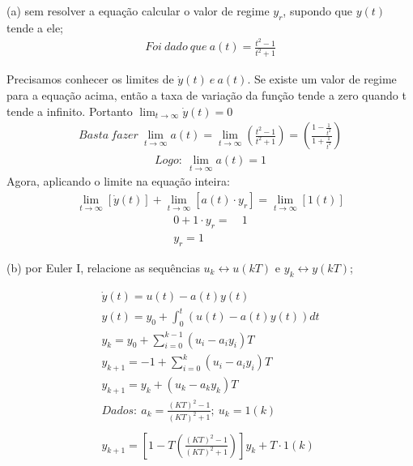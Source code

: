 \documentclass[10pt]{article}
\begin{document}
(a) sem resolver a equação calcular o valor de regime $y_r$, supondo que $y(t)$ tende a ele;
\begin{align*}
    Foi\ dado\ que\ a(t) = \frac{t^2-1}{t^2+1} 
\end{align*}

Precisamos conhecer os limites de $ \dot{y}(t)\ e\ a(t) $.
Se existe um valor de regime para a equação acima, então a taxa de variação da função tende a zero
quando t tende a infinito. Portanto $ \lim_{t\to\infty} \dot{y}(t) = 0 $
\begin{align*}
    Basta\ fazer\ \lim_{t\to\infty} a(t) = \lim_{t\to\infty} \left( \frac{t^2-1}{t^2+1} \right) = \left( \frac{1-\frac{1}{t^2}}{1+\frac{1}{t^2}} \right)
\end{align*}
\begin{align*}
    Logo:\ \lim_{t\to\infty} a(t) = 1
\end{align*}
Agora, aplicando o limite na equação inteira:
\begin{align*}
    \lim_{t\to\infty} [\dot{y}(t)] + \lim_{t\to\infty} [a(t) \cdot y_r] = \lim_{t\to\infty} [1(t)]
\end{align*}
\begin{align*}
    0 + 1 \cdot y_r =&\ 1\\
    y_r = 1
\end{align*}

(b) por Euler I, relacione as sequências $u_k \leftrightarrow u(kT)$ e $y_k \leftrightarrow y(kT)$;

\begin{align*}
    \dot{y}(t) = u(t) - a(t)y(t)\\
    y(t) = y_{0} + \int_{0}^{t} (u(t) - a(t)y(t))dt\\
    y_k = y_0 + \sum_{i=0}^{k-1} (u_i - a_i y_i)T\\
    y_{k+1} = -1 + \sum_{i=0}^{k} (u_i - a_i y_i)T\\
    y_{k+1} = y_k + (u_k - a_k y_k)T\\
    Dados:\ a_k = \frac{(KT)^2-1}{(KT)^2+1};\ u_k = 1(k)\\ \\
    y_{k+1} = \left[ 1 - T \left( \frac{(KT)^2-1}{(KT)^2+1} \right) \right] y_k + T \cdot 1(k)
\end{align*}
\end{document}
